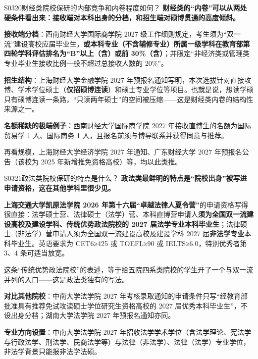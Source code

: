 \begin{qa}{S0320}{财经类院校保研的内部竞争和内卷程度如何？}
\textbf{财经类的“内卷”可以从两处硬条件看出来：接收端对本科出身的分档，和招生端对硕博贯通的高度倾斜。}

\textbf{接收端分档}：西南财经大学国际商学院 2027 级工作细则规定，考生须为“双一流”建设高校应届毕业生，\textbf{或本科专业（不含辅修专业）所属一级学科在教育部第四轮学科评估排名为“B”以上（含）或前 30\%（含）}；并限定“非经济类或管理类专业毕业生接收比例一般不超过总接收人数的 20\%”。

\textbf{招生结构}：上海财经大学金融学院 2027 年预报名通知写明，本次选拔针对直接攻博、学术学位硕士（\textbf{仅招硕博连读}）和硕士专业学位等项目。也就是说，想读学硕只有硕博连读一条路，“只读两年硕士”的空间被压缩——这是财经类内卷的结构性来源之一。

\textbf{名额稀缺的极端例子}：西南财经大学国际商学院 2027 年接收直博生的名额为国际贸易学 1 人、国际商务 1 人，且报名前须与博导联系并获得同意与推荐。

再看规模，上海财经大学经济学院 2027 年通知、广东财经大学 2027 年预报名公告（该校为 2025 年新增推免资格高校）等，均以此类推。
\end{qa}

\begin{qa}{S0321}{政法类院校保研的特点是什么？}
\textbf{政法类最鲜明的特点是“院校出身”被写进申请资格，这在其他学科里很少见。}

\textbf{上海交通大学凯原法学院 2026 年第十六届“卓越法律人夏令营”}的申请资格写得很直接：法学硕士营、法律硕士（法学）营、本科直博营申请人\textbf{须为全国双一流建设高校及建设学科、传统优势政法院校的 2027 届法学专业本科毕业生}；法律硕士（非法学）营申请人须为全国双一流建设高校及建设学科 2027 届\textbf{非法学专业}本科毕业生。英语要求为 CET6≥425 或 TOEFL≥90 或 IELTS≥6.0，特别优秀者第 3、4 条可适当放宽。

这条“传统优势政法院校”的表述，等于给五院四系类院校的学生开了一个与双一流并列的入口——这是政法类独有的写法。

\textbf{对比其他院校}：中南大学法学院 2027 年考核录取通知的申请条件只写“经教育部批准具有推荐免试攻读硕士学位研究生资格高校的 2027 届优秀本科毕业生”，不设出身分档；湖南大学法学院 2027 年预报名通知亦同。

\textbf{专业方向设置}：中南大学法学院 2027 年招收法学学术学位（含法学理论、宪法学与行政法学、刑法学、民商法学等）与法律（非法学）、法律（法学）专业学位，非法学背景只能报非法学法硕。
\end{qa}

